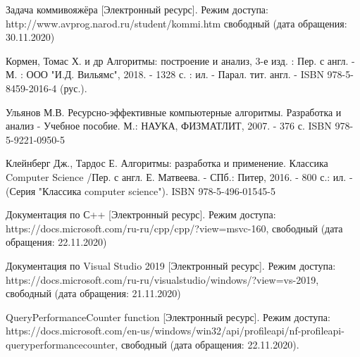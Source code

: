 \documentclass[12pt]{report}
\begin{document}
	\begin{thebibliography}{2}
		
		 Задача коммивояжёра [Электронный ресурс]. Режим доступа: http://www.avprog.narod.ru/student/kommi.htm свободный (дата обращения: 30.11.2020)
		
		 Кормен, Томас Х. и др Алгоритмы: построение и анализ, 3-е изд. : Пер. с англ. - М. : ООО "И.Д. Вильямс", 2018. - 1328 с. : ил. - Парал. тит. англ. -  ISBN 978-5-8459-2016-4 (рус.).
		
		 Ульянов М.В. Ресурсно-эффективные компьютерные алгоритмы. Разработка и анализ - Учебное пособие. М.: НАУКА, ФИЗМАТЛИТ, 2007. - 376 с. ISBN 978-5-9221-0950-5
		
		
		
		 Клейнберг Дж., Тардос Е. Алгоритмы: разработка и применение. Классика Computer Science /Пер. с англ. Е. Матвеева. - СПб.: Питер, 2016. - 800 с.: ил. - (Серия "Классика computer science"). ISBN 978-5-496-01545-5
		
		 Документация по С++  [Электронный ресурс]. Режим доступа: https://docs.microsoft.com/ru-ru/cpp/cpp/?view=msvc-160, свободный (дата обращения: 22.11.2020)
		
		 Документация по Visual Studio 2019 [Электронный ресурс]. Режим доступа: https://docs.microsoft.com/ru-ru/visualstudio/windows/?view=vs-2019, свободный (дата обращения: 21.11.2020)	
		
		 QueryPerformanceCounter function [Электронный ресурс]. Режим доступа: https://docs.microsoft.com/en-us/windows/win32/api/profileapi/nf-profileapi-queryperformancecounter, свободный (дата обращения: 22.11.2020).
	\end{thebibliography}
\end{document}
